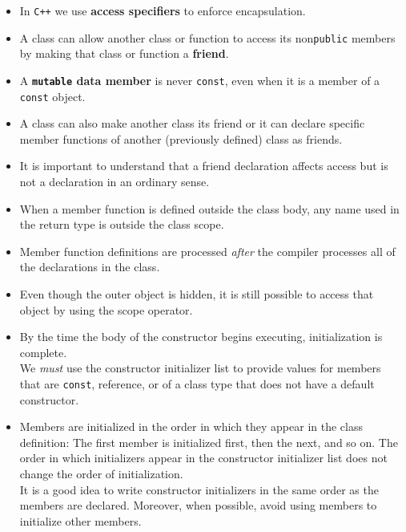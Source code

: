 \begin{itemize}
\item
In \texttt{C++} we use \textbf{access specifiers} to enforce encapsulation.

\item
A class can allow another class or function to access its non\texttt{public} members by making that class or function a \textbf{friend}.

\item
A \textbf{\texttt{mutable} data member} is never \texttt{const}, even when it is a member of a \texttt{const} object.

\item
A class can also make another class its friend or it can declare specific member functions of another (previously defined) class as friends.

\item
It is important to understand that a friend declaration affects access but is not a declaration in an ordinary sense.

\item
When a member function is defined outside the class body, any name used in the return type is outside the class scope.

\item
Member function definitions are processed \textit{after} the compiler processes all of the declarations in the class.

\item
Even though the outer object is hidden, it is still possible to access that object by using the scope operator.

\item
By the time the body of the constructor begins executing, initialization is complete.\\
We \textit{must} use the constructor initializer list to provide values for members that are \texttt{const}, reference, or of a class type that does not have a default constructor.

\item
Members are initialized in the order in which they appear in the class definition: The first member is initialized first, then the next, and so on. The order in which initializers appear in the constructor initializer list does not change the order of initialization.\\
It is a good idea to write constructor initializers in the same order as the members are declared. Moreover, when possible, avoid using members to initialize other members.


\end{itemize}
